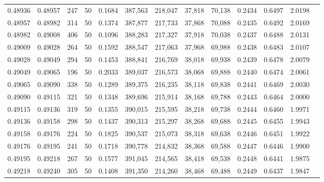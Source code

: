 \begin{tabular}{rrrrrrrrrrrrr}
0.48936 & 0.48957 &   247 &  50 &                                     0.1684 & 387,563 & 218,047 &  37,818 &  70,138 & 0.2434 & 0.6497 & 2.0198 \\
0.48957 & 0.48982 &   314 &  50 &                                     0.1374 & 387,877 & 217,733 &  37,868 &  70,088 & 0.2435 & 0.6492 & 2.0169 \\
0.48982 & 0.49008 &   406 &  50 &                                     0.1096 & 388,283 & 217,327 &  37,918 &  70,038 & 0.2437 & 0.6488 & 2.0131 \\
0.49009 & 0.49028 &   264 &  50 &                                     0.1592 & 388,547 & 217,063 &  37,968 &  69,988 & 0.2438 & 0.6483 & 2.0107 \\
0.49028 & 0.49049 &   294 &  50 &                                     0.1453 & 388,841 & 216,769 &  38,018 &  69,938 & 0.2439 & 0.6478 & 2.0079 \\
0.49049 & 0.49065 &   196 &  50 &                                     0.2033 & 389,037 & 216,573 &  38,068 &  69,888 & 0.2440 & 0.6474 & 2.0061 \\
0.49065 & 0.49090 &   338 &  50 &                                     0.1289 & 389,375 & 216,235 &  38,118 &  69,838 & 0.2441 & 0.6469 & 2.0030 \\
0.49090 & 0.49115 &   321 &  50 &                                     0.1348 & 389,696 & 215,914 &  38,168 &  69,788 & 0.2443 & 0.6464 & 2.0000 \\
0.49115 & 0.49136 &   319 &  50 &                                     0.1355 & 390,015 & 215,595 &  38,218 &  69,738 & 0.2444 & 0.6460 & 1.9971 \\
0.49136 & 0.49158 &   298 &  50 &                                     0.1437 & 390,313 & 215,297 &  38,268 &  69,688 & 0.2445 & 0.6455 & 1.9943 \\
0.49158 & 0.49176 &   224 &  50 &                                     0.1825 & 390,537 & 215,073 &  38,318 &  69,638 & 0.2446 & 0.6451 & 1.9922 \\
0.49176 & 0.49195 &   241 &  50 &                                     0.1718 & 390,778 & 214,832 &  38,368 &  69,588 & 0.2447 & 0.6446 & 1.9900 \\
0.49195 & 0.49218 &   267 &  50 &                                     0.1577 & 391,045 & 214,565 &  38,418 &  69,538 & 0.2448 & 0.6441 & 1.9875 \\
0.49218 & 0.49240 &   305 &  50 &                                     0.1408 & 391,350 & 214,260 &  38,468 &  69,488 & 0.2449 & 0.6437 & 1.9847 \\

\end{tabular}
